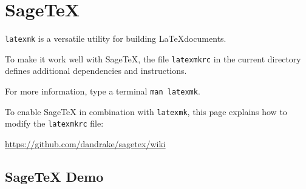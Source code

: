 \documentclass[master.tex]{subfiles}
\begin{document}
\chapter{SageTeX}
\label{ch:sagetex}


\texttt{latexmk} is a versatile utility for building \LaTeX documents.

To make it work well with SageTeX,
the file \texttt{latexmkrc} in the current directory defines
additional dependencies and instructions.

For more information, type a terminal \texttt{man latexmk}.

To enable SageTeX in combination with \texttt{latexmk},
this page explains how to modify the \texttt{latexmkrc} file:

\url{https://github.com/dandrake/sagetex/wiki}

\section{SageTeX Demo}


\end{document}
